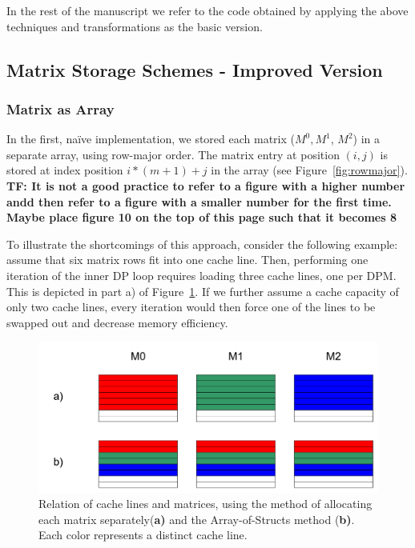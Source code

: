 \documentclass[runningheads,a4paper]{llncs}
\begin{document}
In the rest of the manuscript we refer to the code obtained by applying the above techniques and transformations as the basic version.

\subsection{Matrix Storage Schemes - Improved Version}
\label{sec:caching}

\subsubsection{Matrix as Array}
In the first, na\"ive implementation, we stored each matrix ($M^0, M^1$, $M^2$) in a separate array, using row-major order. 
The matrix entry at position $(i,j)$ is stored at index position $i*(m+1)+j$ in the array (see Figure~\ref{fig:rowmajor}).
\textbf{TF: It is not a good practice to refer to a figure with a higher number andd then refer to a figure with a smaller number for the first time. Maybe place figure 10 on the top of this page such that it becomes 8}

To illustrate the shortcomings of this approach, consider the following example: assume that six matrix rows fit into one cache line. 
Then, performing one iteration of the inner DP loop requires loading three cache lines, one per DPM. 
This is depicted in part a) of Figure~\ref{fig:cachelines}.
If we further assume a cache capacity of only two cache lines, 
every iteration would then force one of the lines to be swapped out and decrease memory efficiency.

\begin{figure}
\centering
\includegraphics[width=\textwidth]{images/cachelines.pdf}
\caption{Relation of cache lines and matrices, using the method of allocating each matrix separately(\textbf{a)} and the Array-of-Structs method (\textbf{b)}. 
Each color represents a distinct cache line.}
\label{fig:cachelines}
\end{figure}
\end{document}
